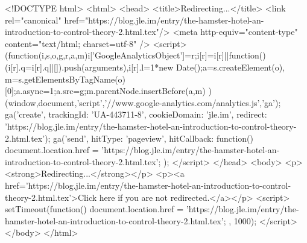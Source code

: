<!DOCTYPE html>
<html>
<head>
<title>Redirecting...</title>
<link rel="canonical" href="https://blog.jle.im/entry/the-hamster-hotel-an-introduction-to-control-theory-2.html.tex"/>
<meta http-equiv="content-type" content="text/html; charset=utf-8" />
<script>
(function(i,s,o,g,r,a,m){i['GoogleAnalyticsObject']=r;i[r]=i[r]||function(){
(i[r].q=i[r].q||[]).push(arguments)},i[r].l=1*new Date();a=s.createElement(o),
m=s.getElementsByTagName(o)[0];a.async=1;a.src=g;m.parentNode.insertBefore(a,m)
})(window,document,'script','//www.google-analytics.com/analytics.js','ga');
ga('create', { trackingId: 'UA-443711-8', cookieDomain: 'jle.im', redirect: 'https://blog.jle.im/entry/the-hamster-hotel-an-introduction-to-control-theory-2.html.tex'});
ga('send', { hitType: 'pageview', hitCallback: function() { document.location.href = 'https://blog.jle.im/entry/the-hamster-hotel-an-introduction-to-control-theory-2.html.tex'; } });
</script>
</head>
<body>
  <p><strong>Redirecting...</strong></p>
  <p><a href='https://blog.jle.im/entry/the-hamster-hotel-an-introduction-to-control-theory-2.html.tex'>Click here if you are not redirected.</a></p>
  <script>
    setTimeout(function() { document.location.href = 'https://blog.jle.im/entry/the-hamster-hotel-an-introduction-to-control-theory-2.html.tex'; }, 1000);
  </script>
</body>
</html>

